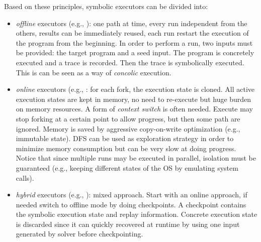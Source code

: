 \documentclass[10pt, a4paper]{article}
\begin{document}
Based on these principles, symbolic executors can be divided into:
\begin{itemize}
  \item {\em offline} executors (e.g., \cite{SAGE-NDSS08}): one path at time, every run independent from the others, results can be immediately reused, each run restart the execution of the program from the beginning. In order to perform a run, two inputs must be provided: the target program and a seed input. The program is concretely executed and a trace is recorded. Then the trace is symbolically executed. This is can be seen as a way of {\em concolic} execution.
  \item {\em online} executors (e.g., \cite{KLEE-OSDI08,CKC-TOCS12,AEG-NDSS11}: for each fork, the execution state is cloned. All active execution states are kept in memory, no need to re-execute but huge burden on memory resources. A form of {\em context switch} is often needed. Execute may stop forking at a certain point to allow progress, but then some path are ignored. Memory is saved by aggressive copy-on-write optimization (e.g., immutable state). DFS can be used as exploration strategy in order to minimize memory consumption but can be very slow at doing progress. Notice that since multiple runs may be executed in parallel, isolation must be guaranteed (e.g., keeping different states of the OS by emulating system calls).
  \item {\em hybrid} executors (e.g., \cite{MAYHEM-SP12}): mixed approach. Start with an online approach, if needed switch to offline mode by doing checkpoints. A checkpoint contains the symbolic execution state and replay information. Concrete execution state is discarded since it can quickly recovered at runtime by using one input generated by solver before checkpointing.
\end{itemize}
\end{document}
